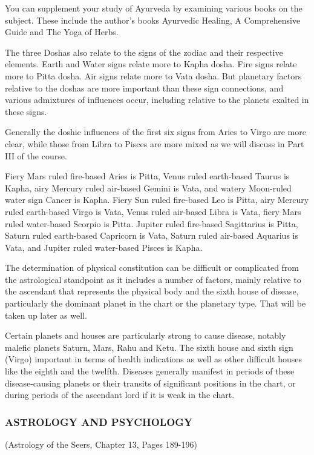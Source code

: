 You can supplement your study of Ayurveda by examining various books on the subject. These include the author’s books Ayurvedic Healing, A Comprehensive Guide and The Yoga of Herbs. 

 

The three Doshas also relate to the signs of the zodiac and their respective elements. Earth and Water signs relate more to Kapha dosha. Fire signs relate more to Pitta dosha. Air signs relate more to Vata dosha. But planetary factors relative to the doshas are more important than these sign connections, and various admixtures of influences occur, including relative to the planets exalted in these signs.

Generally the doshic influences of the first six signs from Aries to Virgo are more clear, while those from Libra to Pisces are more mixed as we will discuss in Part III of the course.

Fiery Mars ruled fire-based Aries is Pitta, Venus ruled earth-based Taurus is Kapha, airy Mercury ruled air-based Gemini is Vata, and watery Moon-ruled water sign Cancer is Kapha.
Fiery Sun ruled fire-based Leo is Pitta, airy Mercury ruled earth-based Virgo is Vata, Venus ruled air-based Libra is Vata, fiery Mars ruled water-based Scorpio is Pitta.
Jupiter ruled fire-based Sagittarius is Pitta, Saturn ruled earth-based Capricorn is Vata, Saturn ruled air-based Aquarius is Vata, and Jupiter ruled water-based Pisces is Kapha.
 

The determination of physical constitution can be difficult or complicated from the astrological standpoint as it includes a number of factors, mainly relative to the ascendant that represents the physical body and the sixth house of disease, particularly the dominant planet in the chart or the planetary type. That will be taken up later as well.

 

Certain planets and houses are particularly strong to cause disease, notably malefic planets Saturn, Mars, Rahu and Ketu. The sixth house and sixth sign (Virgo) important in terms of health indications as well as other difficult houses like the eighth and the twelfth. Diseases generally manifest in periods of these disease-causing planets or their transits of significant positions in the chart, or during periods of the ascendant lord if it is weak in the chart.

 

\subsubsection{ASTROLOGY AND PSYCHOLOGY} (Astrology of the Seers, Chapter 13, Pages 189-196)

